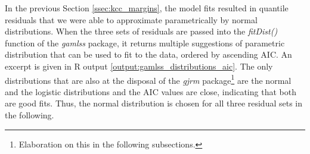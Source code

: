 In the previous Section \ref{ssec:kcc_margins}, the model fits resulted in quantile residuals that we were able to approximate parametrically by normal distributions. When the three sets of residuals are passed into the \textit{fitDist()} function of the \textit{gamlss} package, it returns multiple suggestions of parametric distribution that can be used to fit to the data, ordered by ascending \ac{AIC}. An excerpt is given in R output \ref{output:gamlss_distributions_aic}. The only distributions that are also at the disposal of the \textit{gjrm} package\footnote{Elaboration on this in the following subsections.} are the normal and the logistic distributions and the \ac{AIC} values are close, indicating that both are good fits. Thus, the normal distribution is chosen for all three residual sets in the following.


